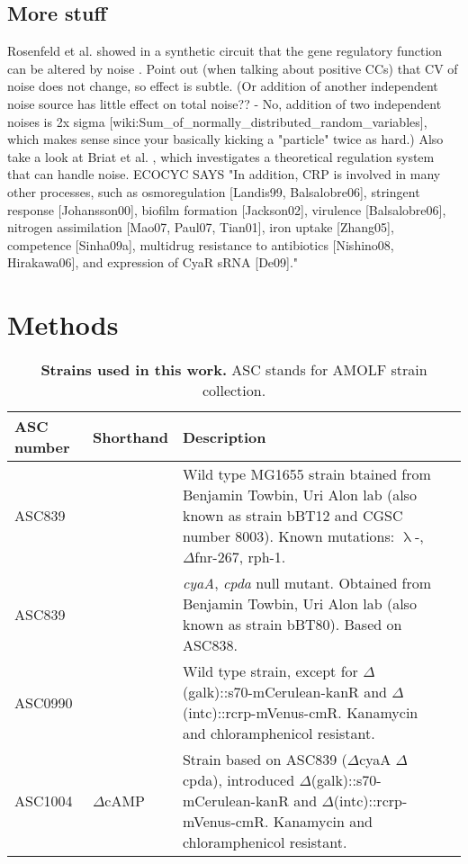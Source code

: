 \subsection*{More stuff}
Rosenfeld et al. showed in a synthetic circuit that the gene regulatory function can be altered by noise \cite{Rosenfeld2005}.
%
Point out (when talking about positive CCs) that CV of noise does not change, so effect is subtle.
(Or addition of another independent noise source has little effect on total noise?? - No, addition of two independent noises is 2x sigma [wiki:Sum\_of\_normally\_distributed\_random\_variables], which makes sense since your basically kicking a "particle" twice as hard.)
%
Also take a look at Briat et al. \cite{Briat2016}, which investigates a theoretical regulation system that can handle noise.
ECOCYC SAYS "In addition, CRP is involved in many other processes, such as osmoregulation [Landis99, Balsalobre06], stringent response [Johansson00], biofilm formation [Jackson02], virulence [Balsalobre06], nitrogen assimilation [Mao07, Paul07, Tian01], iron uptake [Zhang05], competence [Sinha09a], multidrug resistance to antibiotics [Nishino08, Hirakawa06], and expression of CyaR sRNA [De09]."

\section*{Methods}



\begin{table}[h]
	\begin{tabularx}{\textwidth}{llXl}

	\textbf{ASC number}	& \textbf{Shorthand} & \textbf{Description}	\\
	\hline

	ASC839	& 				& Wild type MG1655 strain btained from Benjamin Towbin, Uri Alon lab (also known as strain bBT12 and CGSC number 8003). Known mutations: $\uplambda$-, 	$\Delta$fnr-267, rph-1. \cite{Towbin2017} \\
	ASC839	& 				& \textit{cyaA}, \textit{cpda} null mutant. Obtained from Benjamin Towbin, Uri Alon lab (also known as strain bBT80). Based on ASC838. \cite{Towbin2017} \\
	
	
	ASC0990  &  			& Wild type strain, except for $\Delta$(galk)::s70-mCerulean-kanR and $\Delta$(intc)::rcrp-mVenus-cmR. Kanamycin and chloramphenicol resistant. \\
	ASC1004  & $\Delta$cAMP & Strain based on ASC839 ($\Delta$cyaA $\Delta$cpda), introduced $\Delta$(galk)::s70-mCerulean-kanR and $\Delta$(intc)::rcrp-mVenus-cmR. Kanamycin and chloramphenicol resistant. \\
	
	\hline
	\end{tabularx}
	\caption{\textbf{Strains used in this work.} ASC stands for AMOLF strain collection.}
\end{table}

